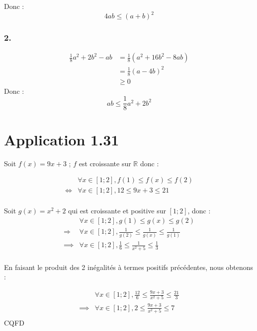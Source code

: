 \documentclass{report}
\begin{document}
Donc :
\[4ab \le (a+b)^2\]

\subsubsection*{2.}
\begin{equation*}
	\begin{split}
		\frac{1}{8}a^2 + 2b^2 - ab &= \frac{1}{8}(a^2+16b^2-8ab) \\
		                           &= \frac{1}{8}(a-4b)^2 \\
		                           &\ge 0
	\end{split}
\end{equation*}	
Donc : \[ab \le\frac{1}{8}a^2 + 2b^2\]

\section*{Application 1.31}

Soit $f(x) = 9x+3$ ; $f$ est croissante sur $\mathbb{R}$ donc :

\begin{equation*}
	\begin{split}
		& \forall x \in [1 ; 2], f(1) \le f(x) \le f(2) \\
		\Longleftrightarrow & \forall x \in [1 ; 2], 12 \le 9x+3 \le 21 \\
	\end{split}
\end{equation*}

Soit $g(x)=x^2+2$ qui est croissante et positive sur $[1;2]$, donc :
\begin{equation*}
	\begin{split}
		                & \forall x \in [1 ; 2], g(1) \le g(x) \le g(2) \\
		\Longrightarrow & \forall x \in [1 ; 2], \frac{1}{g(2)} \le \frac{1}{g(x)} \le \frac{1}{g(1)} \\
		\implies        & \forall x \in [1 ; 2], \frac{1}{6} \le \frac{1}{x^2+5} \le \frac{1}{3} \\
	\end{split}
\end{equation*}

En faisant le produit des 2 inégalités à termes positifs précédentes, nous obtenons :
 
\begin{equation*}
	\begin{split}
		         & \forall x \in [1 ; 2], \frac{12}{6} \le \frac{9x + 3}{x^2+5} \le \frac{21}{3} \\
		\implies & \forall x \in [1 ; 2], 2 \le \frac{9x + 3}{x^2+5} \le 7 \\
	\end{split}
\end{equation*}
CQFD
\end{document}
